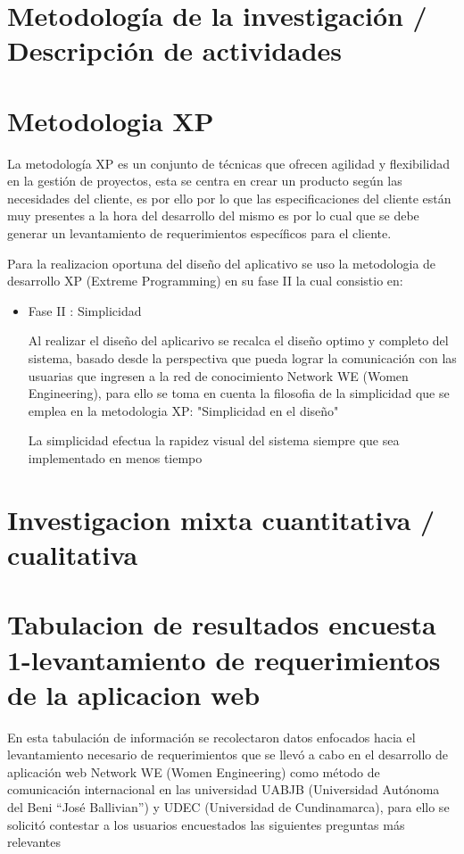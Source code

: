 \documentclass[hidelinks]{Documento}
\begin{document}
\section{Metodología de la investigación / Descripción de actividades}


\section{Metodologia XP}

La metodología XP es un conjunto de técnicas que ofrecen agilidad y flexibilidad en la gestión de proyectos, esta se centra en crear un producto según las necesidades del cliente, es por ello por lo que las especificaciones del cliente están muy presentes a la hora del desarrollo del mismo es por lo cual que se debe generar un levantamiento de requerimientos específicos para el cliente.


Para la realizacion oportuna del diseño del aplicativo se uso la metodologia de desarrollo XP (Extreme Programming) en su fase II la cual consistio en:

\begin{itemize}
    \item Fase II : Simplicidad

    Al realizar el diseño del aplicarivo se recalca el diseño optimo y completo del sistema, basado desde la perspectiva que pueda lograr la comunicación con las usuarias que ingresen a la red de conocimiento Network WE (Women Engineering), para ello se toma en cuenta la filosofia de la simplicidad que se emplea en la metodologia XP: "Simplicidad en el diseño"

    La simplicidad efectua la rapidez visual del sistema siempre que sea implementado en menos tiempo  

\end{itemize}

\section{Investigacion mixta cuantitativa / cualitativa}
\section{Tabulacion de resultados encuesta 1-levantamiento de requerimientos de la aplicacion web}

En esta tabulación de información se recolectaron datos enfocados hacia el levantamiento necesario de requerimientos que se llevó a cabo en el desarrollo de aplicación web Network WE (Women Engineering) como método de comunicación internacional en las universidad UABJB (Universidad Autónoma del Beni “José Ballivian”) y UDEC (Universidad de Cundinamarca), para ello se solicitó contestar a los usuarios encuestados las siguientes preguntas más relevantes
\end{document}

